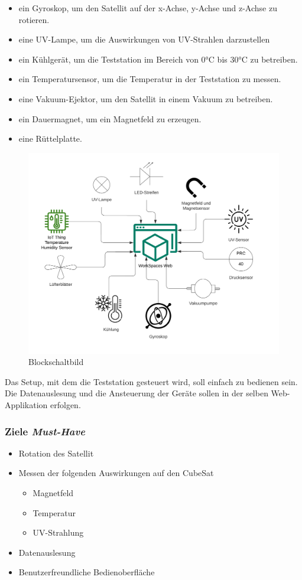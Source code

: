 \newpage
\begin{itemize}
    \item ein Gyroskop, um den Satellit auf der x-Achse, y-Achse und z-Achse zu rotieren.
    \item eine UV-Lampe, um die Auswirkungen von UV-Strahlen darzustellen 
    \item ein Kühlgerät, um die Teststation im Bereich von 0°C bis 30°C zu betreiben. 
    \item ein Temperatursensor, um die Temperatur in der Teststation zu messen.
    \item eine Vakuum-Ejektor, um den Satellit in einem Vakuum zu betreiben.
    \item ein Dauermagnet, um ein Magnetfeld zu erzeugen.
    \item eine Rüttelplatte.
\end{itemize}
\begin{figure}[H]
	\centering
	\includegraphics[scale=0.2]{image/blockgesamt.png}
	\caption{Blockschaltbild}
	\label{fig:enter-label}
\end{figure}

Das Setup, mit dem die Teststation gesteuert wird, soll einfach zu bedienen sein. Die Datenauslesung und die Ansteuerung der Geräte sollen in der selben Web-Applikation erfolgen. 
\newpage
\subsubsection{Ziele \textit{Must-Have}}
\begin{itemize}
    \item Rotation des Satellit
    \item Messen der folgenden Auswirkungen auf den CubeSat
    \begin{itemize}
        \item Magnetfeld
        \item Temperatur
        \item UV-Strahlung 
    \end{itemize}
    \item Datenauslesung 
    \item Benutzerfreundliche Bedienoberfläche
\end{itemize}

